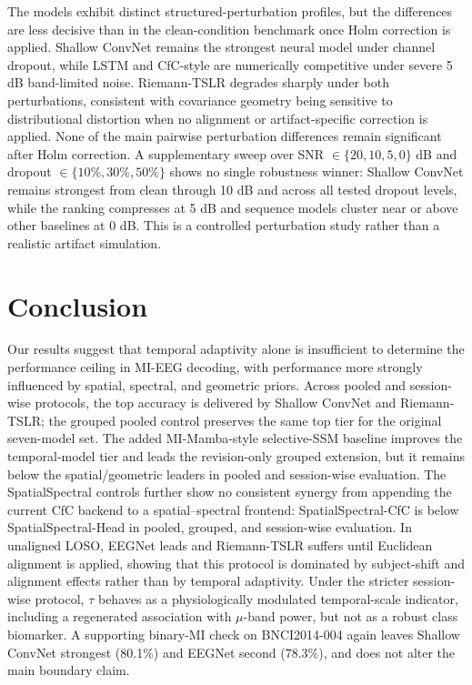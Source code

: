 \documentclass[journal]{IEEEtran}
\begin{document}
The models exhibit distinct structured-perturbation profiles, but the differences are less decisive than in the clean-condition benchmark once Holm correction is applied. Shallow ConvNet remains the strongest neural model under channel dropout, while LSTM and CfC-style are numerically competitive under severe 5 dB band-limited noise. Riemann-TSLR degrades sharply under both perturbations, consistent with covariance geometry being sensitive to distributional distortion when no alignment or artifact-specific correction is applied. None of the main pairwise perturbation differences remain significant after Holm correction. A supplementary sweep over SNR $\in \{20,10,5,0\}$ dB and dropout $\in \{10\%,30\%,50\%\}$ shows no single robustness winner: Shallow ConvNet remains strongest from clean through 10 dB and across all tested dropout levels, while the ranking compresses at 5 dB and sequence models cluster near or above other baselines at 0 dB. This is a controlled perturbation study rather than a realistic artifact simulation.

\section{Conclusion}

Our results suggest that temporal adaptivity alone is insufficient to determine the performance ceiling in MI-EEG decoding, with performance more strongly influenced by spatial, spectral, and geometric priors. Across pooled and session-wise protocols, the top accuracy is delivered by Shallow ConvNet and Riemann-TSLR; the grouped pooled control preserves the same top tier for the original seven-model set. The added MI-Mamba-style selective-SSM baseline improves the temporal-model tier and leads the revision-only grouped extension, but it remains below the spatial/geometric leaders in pooled and session-wise evaluation. The SpatialSpectral controls further show no consistent synergy from appending the current CfC backend to a spatial--spectral frontend: SpatialSpectral-CfC is below SpatialSpectral-Head in pooled, grouped, and session-wise evaluation. In unaligned LOSO, EEGNet leads and Riemann-TSLR suffers until Euclidean alignment is applied, showing that this protocol is dominated by subject-shift and alignment effects rather than by temporal adaptivity. Under the stricter session-wise protocol, $\tau$ behaves as a physiologically modulated temporal-scale indicator, including a regenerated association with $\mu$-band power, but not as a robust class biomarker. A supporting binary-MI check on BNCI2014-004 again leaves Shallow ConvNet strongest (80.1\%) and EEGNet second (78.3\%), and does not alter the main boundary claim.
\end{document}
